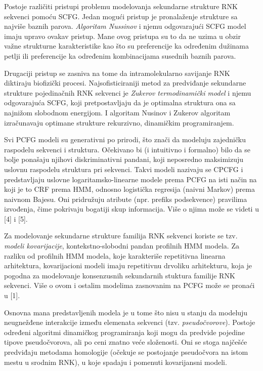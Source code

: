 \documentclass[a4paper, 12pt]{article}
\begin{document}
Postoje različiti pristupi problemu modelovanja sekundarne strukture RNK sekvenci pomoću SCFG. Jedan mogući pristup je pronalaženje strukture sa najviše baznih parova. \textit{Algoritam Nussinov} i njemu odgovarajući SCFG model imaju upravo ovakav pristup. Mane ovog pristupa su to da ne uzima u obzir važne strukturne karakteristike kao što su preferencije ka određenim dužinama petlji ili preferencije ka određenim kombinacijama susednih baznih parova.

Drugaciji pristup se zasniva na tome da intramolekularno savijanje RNK diktiraju biofizički procesi. Najsofisticiraniji metod za predviđanje sekundarne strukture pojedinačnih RNK sekvenci je \textit{Zukerov termodinamički model} i njemu odgovarajuća SCFG, koji pretpostavljaju da je optimalna struktura ona sa najnižom slobodnom energijom. I algoritam Nusinov i Zukerov algoritam izračunavaju optimane strukture rekurzivno, dinamičkim programiranjem.

Svi PCFG modeli su generativni po prirodi, što znači da modeluju zajedničku raspodelu sekvenci i struktura. Očekivano bi (i intuitivno i formalno) bilo da se bolje ponašaju njihovi diskriminativni pandani, koji neposredno maksimizuju uslovnu raspodelu struktura pri sekvenci. Takvi modeli nazivaju se CPCFG i predstavljaju uslovne logaritamsko-linearne modele prema PCFG na isti način na koji je to CRF prema HMM, odnosno logistička regresija (naivni Markov) prema naivnom Bajesu. Oni pridružuju atribute (npr. prefiks podsekvence) pravilima izvođenja, čime pokrivaju bogatiji skup informacija. Više o njima može se videti u [4] i [5].

Za modelovanje sekundarne strukture familija RNK sekvenci koriste se tzv. \textit{modeli kovarijacije}, kontekstno-slobodni pandan profilnih HMM modela. Za razliku od profilnih HMM modela, koje karakteriše repetitivna linearna arhitektura, kovarijacioni modeli imaju repetitivnu drvoliku arhitekturu, koja je pogodna za modelovanje konsenzusnih sekundarnih stuktura familije RNK sekvenci. Više o ovom i ostalim modelima zasnovanim na PCFG može se pronaći u [1].

Osnovna mana predstavljenih modela je u tome što nisu u stanju da modeluju neugnežđene interakcije između elemenata sekvenci (tzv. \textit{pseudočvorove}). Postoje određeni algoritmi dinamičkog programiranja koji mogu da predvide pojedine tipove pseudočvorova, ali po ceni znatno veće složenosti. Oni se stoga najčešće predviđaju metodama homologije (očekuje se postojanje pseudočvora na istom mestu u srodnim RNK), u koje spadaju i pomenuti kovarijansni modeli.
\end{document}
